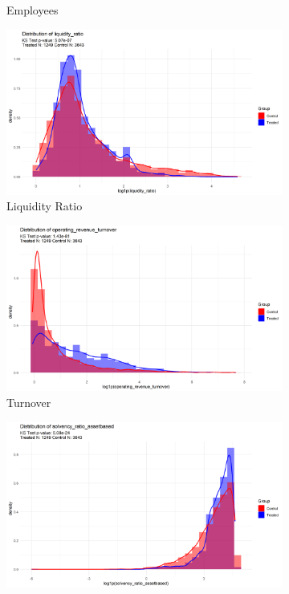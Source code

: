 \documentclass[12pt]{report}
\begin{document}
\begin{figure}[ht]
\begin{subfigure}[b]{0.45\textwidth}
        \caption{Employees}
        \label{fig:employees}
    \end{subfigure}
    \vfill
    \begin{subfigure}[b]{0.45\textwidth}
        \centering
        \includegraphics[width=\linewidth]{../Output/distrib_compare_liquidity_ratio_allcountries.png}
        \caption{Liquidity Ratio}
        \label{fig:liquidityratio}
    \end{subfigure}
    \hfill
    \begin{subfigure}[b]{0.45\textwidth}
        \centering
        \includegraphics[width=\linewidth]{../Output/distrib_compare_operating_revenue_turnover_allcountries.png}
        \caption{Turnover}
        \label{fig:turnover}
    \end{subfigure}
    \vfill
    \begin{subfigure}[b]{0.45\textwidth}
        \centering
        \includegraphics[width=\linewidth]{../Output/distrib_compare_solvency_ratio_assetbased_allcountries.png}

\end{subfigure}
\end{figure}
\end{document}
